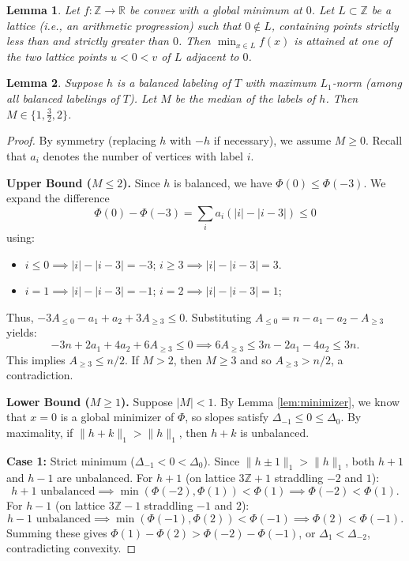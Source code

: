 \documentclass[10pt,a4paper]{amsart}
\newtheorem{lem}{Lemma}
\newcommand{\R}{\mathbb{R}}
\newcommand{\Z}{\mathbb{Z}}
\begin{document}
\begin{lem}
\label{lem:lattice}
Let $f\colon \Z \to \R$ be convex with a global minimum at $0$. Let $L \subset \Z$ be a lattice (i.e., an arithmetic progression) such that $0 \notin L$, containing points strictly less than and strictly greater than $0$. Then $\min_{x \in L} f(x)$ is attained at one of the two lattice points $u < 0 < v$ of $L$ adjacent to $0$.
\end{lem}

\begin{lem}\label{lem:median-control}
Suppose $h$ is a balanced labeling of $T$ with maximum $L_1$-norm (among all balanced labelings of $T$). Let $M$ be the median of the labels of $h$. Then $M\in \{1, \frac{3}{2}, 2\}$.
\end{lem}

\begin{proof} By symmetry (replacing $h$ with $-h$ if necessary), we assume $M \ge 0$. Recall that $a_i$ denotes the number of vertices with label $i$.

\medskip\noindent
\textbf{Upper Bound ($M \le 2$).}
Since $h$ is balanced, we have $\Phi(0) \le \Phi(-3)$. We expand the difference 
\[
\Phi(0) - \Phi(-3) = \sum_{i} a_i (|i| - |i-3|)\leq 0
\]
using:
\begin{itemize}[noitemsep]
    \item $i \le 0 \implies |i| - |i-3| = -3$; \quad $i \ge 3 \implies |i| - |i-3| = 3$.
    \item $i = 1 \implies |i| - |i-3| = -1$; \quad $i = 2 \implies |i| - |i-3| = 1$;
\end{itemize}
Thus, $-3A_{\le 0} - a_1 + a_2 + 3A_{\ge 3} \le 0$. Substituting $A_{\le 0} = n - a_1 - a_2 - A_{\ge 3}$ yields:
\[
-3n + 2a_1 + 4a_2 + 6A_{\ge 3} \le 0 \implies 6A_{\ge 3} \le 3n - 2a_1 - 4a_2 \le 3n.
\]
This implies $A_{\ge 3} \le n/2$. If $M > 2$, then $M \ge 3$ and so $A_{\ge 3} > n/2$, a contradiction.

\medskip\noindent
\textbf{Lower Bound ($M \ge 1$).}
Suppose $|M| < 1$. By Lemma \ref{lem:minimizer}, we know that $x=0$ is a global minimizer of $\Phi$, so slopes satisfy $\Delta_{-1} \le 0 \le \Delta_0$. By maximality, if $\|h+k\|_1 > \|h\|_1$, then $h+k$ is unbalanced.

\smallskip
\textbf{Case 1:} Strict minimum ($\Delta_{-1} < 0 < \Delta_0$).
Since $\|h\pm 1\|_1 > \|h\|_1$, both $h+1$ and $h-1$ are unbalanced.
For $h+1$ (on lattice $3\Z+1$ straddling $-2$ and $1$):
\[
\text{$h+1$ unbalanced} \implies \min(\Phi(-2), \Phi(1)) < \Phi(1) \implies \Phi(-2) < \Phi(1).
\]
For $h-1$ (on lattice $3\Z-1$ straddling $-1$ and $2$):
\[
\text{$h-1$ unbalanced} \implies \min(\Phi(-1), \Phi(2)) < \Phi(-1) \implies \Phi(2) < \Phi(-1).
\]
Summing these gives $\Phi(1) - \Phi(2) > \Phi(-2) - \Phi(-1)$, or $\Delta_1 < \Delta_{-2}$, contradicting convexity.


\end{proof}
\end{document}

